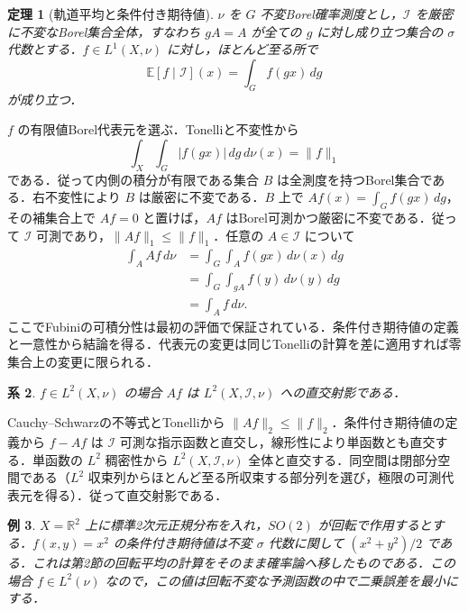 \documentclass[a5paper,10pt,onecolumn]{jsarticle}
\makeatletter
\theoremstyle{mathnotetheorem}
\newtheorem{theorem}{定理}[section]
\newtheorem{corollary}[theorem]{系}
\newtheorem{example}[theorem]{例}
\renewcommand{\proofname}{証明}
\renewenvironment{proof}[1][\proofname]{%
  \par\pushQED{\qed}\normalfont\topsep4\p@\@plus2\p@\relax
  \trivlist\item[\hskip\labelsep\bfseries #1]\ignorespaces
}{\popQED\endtrivlist\@endpefalse}
\newcommand{\R}{\mathbb{R}}
\newcommand{\norm}[1]{\lVert #1\rVert}
\newcommand{\abs}[1]{\lvert #1\rvert}
\makeatother
\begin{document}
\begin{theorem}[軌道平均と条件付き期待値]\label{conditional}
$\nu$ を $G$ 不変Borel確率測度とし，$\mathcal I$ を厳密に不変なBorel集合全体，すなわち $gA=A$ が全ての $g$ に対し成り立つ集合の $\sigma$ 代数とする．$f\in L^1(X,\nu)$ に対し，ほとんど至る所で
\[
 \mathbb E[f\mid\mathcal I](x)=\int_G f(gx)\,dg
\]
が成り立つ．
\end{theorem}
\begin{proof}
$f$ の有限値Borel代表元を選ぶ．Tonelliと不変性から
\[
 \int_X\int_G\abs{f(gx)}\,dg\,d\nu(x)=\norm f_1
\]
である．従って内側の積分が有限である集合 $B$ は全測度を持つBorel集合である．右不変性により $B$ は厳密に不変である．$B$ 上で $Af(x)=\int_G f(gx)\,dg$，その補集合上で $Af=0$ と置けば，$Af$ はBorel可測かつ厳密に不変である．従って $\mathcal I$ 可測であり，$\norm{Af}_1\le\norm f_1$．任意の $A\in\mathcal I$ について
\begin{align*}
 \int_A Af\,d\nu&=\int_G\int_A f(gx)\,d\nu(x)\,dg\\
 &=\int_G\int_{gA}f(y)\,d\nu(y)\,dg\\
 &=\int_A f\,d\nu.
\end{align*}
ここでFubiniの可積分性は最初の評価で保証されている．条件付き期待値の定義と一意性から結論を得る．代表元の変更は同じTonelliの計算を差に適用すれば零集合上の変更に限られる．
\end{proof}
\begin{corollary}
$f\in L^2(X,\nu)$ の場合 $Af$ は $L^2(X,\mathcal I,\nu)$ への直交射影である．
\end{corollary}
\begin{proof}
Cauchy--Schwarzの不等式とTonelliから $\norm{Af}_2\le\norm f_2$．条件付き期待値の定義から $f-Af$ は $\mathcal I$ 可測な指示函数と直交し，線形性により単函数とも直交する．単函数の $L^2$ 稠密性から $L^2(X,\mathcal I,\nu)$ 全体と直交する．同空間は閉部分空間である（$L^2$ 収束列からほとんど至る所収束する部分列を選び，極限の可測代表元を得る）．従って直交射影である．
\end{proof}
\begin{example}
$X=\R^2$ 上に標準2次元正規分布を入れ，$SO(2)$ が回転で作用するとする．$f(x,y)=x^2$ の条件付き期待値は不変 $\sigma$ 代数に関して $(x^2+y^2)/2$ である．これは第2節の回転平均の計算をそのまま確率論へ移したものである．この場合 $f\in L^2(\nu)$ なので，この値は回転不変な予測函数の中で二乗誤差を最小にする．
\end{example}
\end{document}
